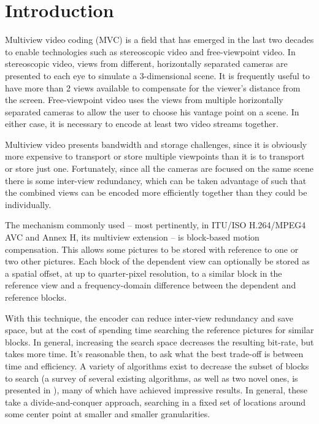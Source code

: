 \documentclass{sig-alternate-05-2015}
\begin{document}

\section{Introduction} %
\label{sec:introduction} %
Multiview video coding (MVC) is a field that has emerged in the last two decades
to enable technologies such as stereoscopic video and free-viewpoint video. In
stereoscopic video, views from different, horizontally separated cameras are
presented to each eye to simulate a 3-dimensional scene. It is frequently useful
to have more than 2 views available to compensate for the viewer's distance from
the screen. Free-viewpoint video uses the views from multiple horizontally
separated cameras to allow the user to choose his vantage point on a scene. In
either case, it is necessary to encode at least two video streams together.

Multiview video presents bandwidth and storage challenges, since it is obviously
more expensive to transport or store multiple viewpoints than it is to transport
or store just one. Fortunately, since all the cameras are focused on the same
scene there is some inter-view redundancy, which can be taken advantage of such
that the combined views can be encoded more efficiently together than they could
be individually.

The mechanism commonly used -- most pertinently, in ITU/ISO H.264/MPEG4 AVC
and Annex H, its multiview extension -- is block-based motion compensation. This
allows some pictures to be stored with reference to one or two other pictures.
Each block of the dependent view can optionally be stored as a spatial offset,
at up to quarter-pixel resolution, to a similar block in the reference view and
a frequency-domain difference between the dependent and reference blocks.

With this technique, the encoder can reduce inter-view redundancy and save
space, but at the cost of spending time searching the reference pictures for
similar blocks. In general, increasing the search space decreases the resulting
bit-rate, but takes more time. It's reasonable then, to ask what the best
trade-off is between time and efficiency. A variety of algorithms exist to
decrease the subset of blocks to search (a survey of several existing
algorithms, as well as two novel ones, is presented in \cite{khattak:fast}),
many of which have achieved impressive results. In general, these take a
divide-and-conquer approach, searching in a fixed set of locations around some
center point at smaller and smaller granularities.
\end{document}
